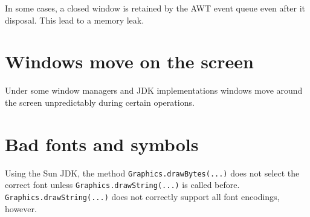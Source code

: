 In some cases, a closed window is retained by the AWT event queue
even after it disposal. This lead to a memory leak.


\section{Windows move on the screen}

Under some window managers and JDK implementations
windows move around the screen unpredictably
during certain operations.


\section{Bad fonts and symbols}

Using the Sun JDK, the method \texttt{Graphics.drawBytes(...)}
does not select the correct font unless
\texttt{Graphics.drawString(...)} is called before.
\texttt{Graphics.drawString(...)} does not correctly support all font
encodings, however.

